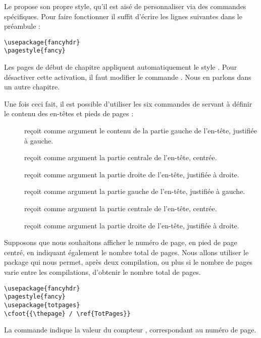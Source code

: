 Le  propose son propre style, qu'il est aisé de personnaliser via des commandes spécifiques. Pour faire fonctionner  il suffit d'écrire les lignes suivantes dans le préambule :
\begin{verbatim}
\usepackage{fancyhdr}
\pagestyle{fancy}
\end{verbatim}

\begin{plusloins}
Les pages de début de chapitre appliquent automatiquement le style . Pour désactiver cette activation, il faut modifier le commande . Nous en parlons dans un autre chapitre. 
\end{plusloins}


Une fois ceci fait, il est possible d'utiliser les six commandes de  servant à définir le contenu des en-têtes et pieds de pages :

\begin{description}
\item[] reçoit comme argument le contenu de la partie gauche de l'en-tête, justifiée à gauche.
\item[] reçoit comme argument la partie centrale de l'en-tête, centrée.
\item[] reçoit comme argument la partie droite de l'en-tête, justifiée à droite.
\item[] reçoit comme argument la partie gauche de l'en-tête, justifiée à gauche.
\item[] reçoit comme argument la partie centrale de l'en-tête, centrée.
\item[] reçoit comme argument la partie droite de l'en-tête, justifiée à droite.
\end{description}



Supposons que nous souhaitons afficher le numéro de page, en pied de page centré, en indiquant également le nombre total de pages. Nous allons utiliser le package  qui nous permet, après deux compilation, ou plus si le nombre de pages varie entre les compilations, d'obtenir le nombre total de pages.
\begin{verbatim}
\usepackage{fancyhdr}
\pagestyle{fancy}
\usepackage{totpages}
\cfoot{{\thepage} / \ref{TotPages}}
\end{verbatim}



La commande  indique la valeur du compteur , correspondant au numéro de page.

